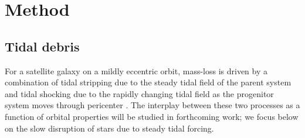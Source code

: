 \documentclass[letterpaper,12pt,preprint]{aastex}
\begin{document}
\section{Method}

\subsection{Tidal debris}\label{sec:debris}

For a satellite galaxy on a mildly eccentric orbit, mass-loss is driven by a combination of tidal stripping due to the steady tidal field of the parent system and tidal shocking due to the rapidly changing tidal field as the progenitor system moves through pericenter \citep[e.g.,][]{choi09}. The interplay between these two processes as a function of orbital properties will be studied in forthcoming work; we focus below on the slow disruption of stars due to steady tidal forcing. 
\end{document}
